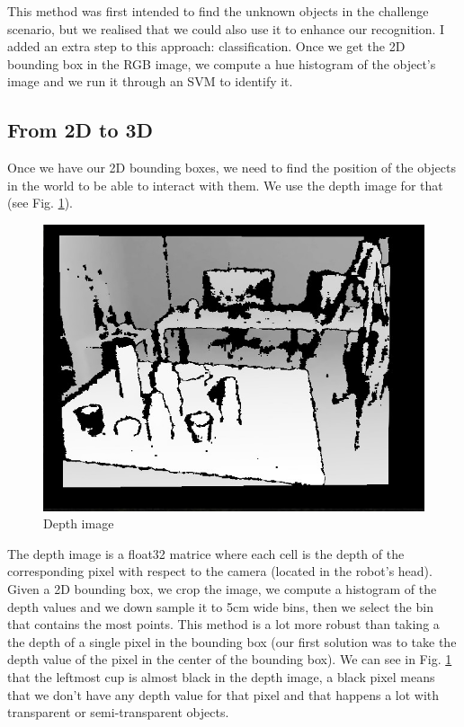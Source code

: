 \documentclass[a4paper, twocolumn]{article}
\begin{document}
    This method was first intended to find the unknown objects in the challenge scenario, but we realised that we could also use it to enhance our recognition. I added an extra step to this approach: classification. Once we get the 2D bounding box in the RGB image, we compute a hue histogram of the object's image and we run it through an SVM to identify it.

    \subsection{From 2D to 3D}

    Once we have our 2D bounding boxes, we need to find the position of the objects in the world to be able to interact with them. We use the depth image for that (see Fig. \ref{depth_image}).

    \begin{figure}[!b]
        \includegraphics[width=\columnwidth]{../img/depth_image.jpg}
        \caption{Depth image}
        \label{depth_image}
    \end{figure}

    The depth image is a float32 matrice where each cell is the depth of the corresponding pixel with respect to the camera (located in the robot's head). Given a 2D bounding box, we crop the image, we compute a histogram of the depth values and we down sample it to 5cm wide bins, then we select the bin that contains the most points. This method is a lot more robust than taking a the depth of a single pixel in the bounding box (our first solution was to take the depth value of the pixel in the center of the bounding box). We can see in Fig. \ref{depth_image} that the leftmost cup is almost black in the depth image, a black pixel means that we don't have any depth value for that pixel and that happens a lot with transparent or semi-transparent objects.
\end{document}
